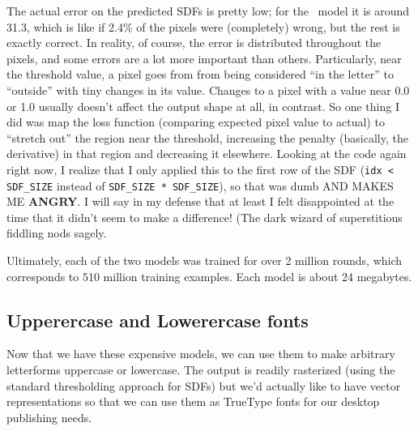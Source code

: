 \documentclass[twocolumn]{article}
\begin{document}
The actual error on the predicted SDFs is pretty low; for the
\makelowercase\ model it is around 31.3, which is like if 2.4\% of the
pixels were (completely) wrong, but the rest is exactly correct. In
reality, of course, the error is distributed throughout the pixels,
and some errors are a lot more important than others. Particularly,
near the threshold value, a pixel goes from from being considered ``in
the letter'' to ``outside'' with tiny changes in its value. Changes to
a pixel with a value near 0.0 or 1.0 usually doesn't affect the output
shape at all, in contrast. So one thing I did was map the loss
function (comparing expected pixel value to actual) to ``stretch out''
the region near the threshold, increasing the penalty (basically, the
derivative) in that region and decreasing it elsewhere. Looking at the
code again right now, I realize that I only applied this to the first
row of the SDF (\verb+idx < SDF_SIZE+ instead of
\verb+SDF_SIZE * SDF_SIZE+), so that was dumb AND MAKES ME {\bf
  ANGRY}. I will say in my defense that at least I felt disappointed
at the time that it didn't seem to make a difference! (The dark
wizard of superstitious fiddling nods sagely.


Ultimately, each of the two models was trained for over 2 million
rounds, which corresponds to 510 million training examples. Each
model is about 24 megabytes.

\subsection{Upperercase and Lowerercase fonts} \label{sec:fonts}

Now that we have these expensive models, we can use them to make
arbitrary letterforms uppercase or lowercase. The output is readily
rasterized (using the standard thresholding approach for SDFs) but
we'd actually like to have vector representations so that we can
use them as TrueType fonts for our desktop publishing needs.
\end{document}
